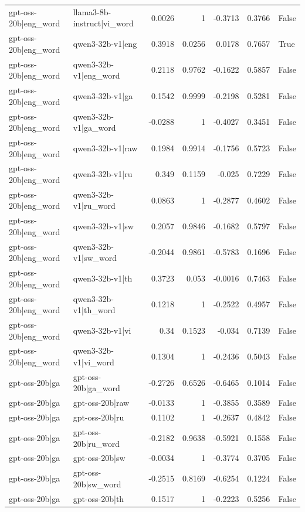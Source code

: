 \begin{table}
\begin{tabular}{l l r r r r l}
gpt-oss-20b|eng_word & llama3-8b-instruct|vi_word & 0.0026 & 1 & -0.3713 & 0.3766 & False \\
gpt-oss-20b|eng_word & qwen3-32b-v1|eng & 0.3918 & 0.0256 & 0.0178 & 0.7657 & True \\
gpt-oss-20b|eng_word & qwen3-32b-v1|eng_word & 0.2118 & 0.9762 & -0.1622 & 0.5857 & False \\
gpt-oss-20b|eng_word & qwen3-32b-v1|ga & 0.1542 & 0.9999 & -0.2198 & 0.5281 & False \\
gpt-oss-20b|eng_word & qwen3-32b-v1|ga_word & -0.0288 & 1 & -0.4027 & 0.3451 & False \\
gpt-oss-20b|eng_word & qwen3-32b-v1|raw & 0.1984 & 0.9914 & -0.1756 & 0.5723 & False \\
gpt-oss-20b|eng_word & qwen3-32b-v1|ru & 0.349 & 0.1159 & -0.025 & 0.7229 & False \\
gpt-oss-20b|eng_word & qwen3-32b-v1|ru_word & 0.0863 & 1 & -0.2877 & 0.4602 & False \\
gpt-oss-20b|eng_word & qwen3-32b-v1|sw & 0.2057 & 0.9846 & -0.1682 & 0.5797 & False \\
gpt-oss-20b|eng_word & qwen3-32b-v1|sw_word & -0.2044 & 0.9861 & -0.5783 & 0.1696 & False \\
gpt-oss-20b|eng_word & qwen3-32b-v1|th & 0.3723 & 0.053 & -0.0016 & 0.7463 & False \\
gpt-oss-20b|eng_word & qwen3-32b-v1|th_word & 0.1218 & 1 & -0.2522 & 0.4957 & False \\
gpt-oss-20b|eng_word & qwen3-32b-v1|vi & 0.34 & 0.1523 & -0.034 & 0.7139 & False \\
gpt-oss-20b|eng_word & qwen3-32b-v1|vi_word & 0.1304 & 1 & -0.2436 & 0.5043 & False \\
gpt-oss-20b|ga & gpt-oss-20b|ga_word & -0.2726 & 0.6526 & -0.6465 & 0.1014 & False \\
gpt-oss-20b|ga & gpt-oss-20b|raw & -0.0133 & 1 & -0.3855 & 0.3589 & False \\
gpt-oss-20b|ga & gpt-oss-20b|ru & 0.1102 & 1 & -0.2637 & 0.4842 & False \\
gpt-oss-20b|ga & gpt-oss-20b|ru_word & -0.2182 & 0.9638 & -0.5921 & 0.1558 & False \\
gpt-oss-20b|ga & gpt-oss-20b|sw & -0.0034 & 1 & -0.3774 & 0.3705 & False \\
gpt-oss-20b|ga & gpt-oss-20b|sw_word & -0.2515 & 0.8169 & -0.6254 & 0.1224 & False \\
gpt-oss-20b|ga & gpt-oss-20b|th & 0.1517 & 1 & -0.2223 & 0.5256 & False \\

\end{tabular}
\end{table}
